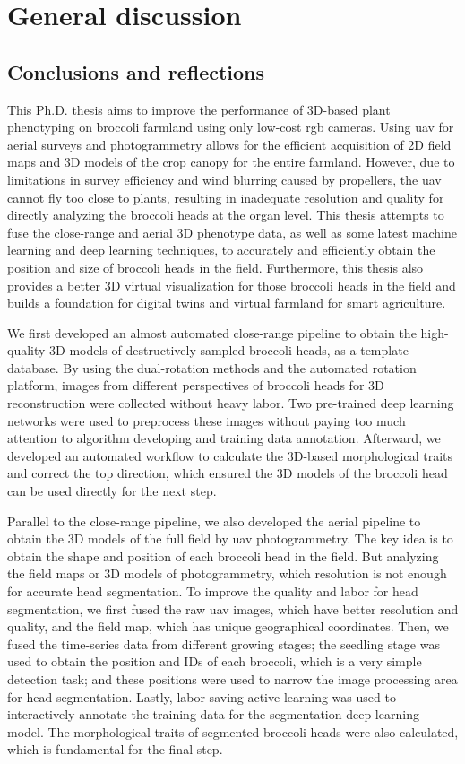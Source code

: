 \chapter{General discussion}

\section{Conclusions and reflections}

This Ph.D. thesis aims to improve the performance of 3D-based plant phenotyping on broccoli farmland using only low-cost \gls{rgb} cameras. Using \gls{uav} for aerial surveys and photogrammetry allows for the efficient acquisition of 2D field maps and 3D models of the crop canopy for the entire farmland. However, due to limitations in survey efficiency and wind blurring caused by propellers, the \gls{uav} cannot fly too close to plants, resulting in inadequate resolution and quality for directly analyzing the broccoli heads at the organ level. This thesis attempts to fuse the close-range and aerial 3D phenotype data, as well as some latest machine learning and deep learning techniques, to accurately and efficiently obtain the position and size of broccoli heads in the field. Furthermore, this thesis also provides a better 3D virtual visualization for those broccoli heads in the field and builds a foundation for digital twins and virtual farmland for smart agriculture. 

We first developed an almost automated close-range pipeline to obtain the high-quality 3D models of destructively sampled broccoli heads, as a template database. By using the dual-rotation methods and the automated rotation platform, images from different perspectives of broccoli heads for 3D reconstruction were collected without heavy labor. Two pre-trained deep learning networks were used to preprocess these images without paying too much attention to algorithm developing and training data annotation. Afterward, we developed an automated workflow to calculate the 3D-based morphological traits and correct the top direction, which ensured the 3D models of the broccoli head can be used directly for the next step.

Parallel to the close-range pipeline, we also developed the aerial pipeline to obtain the 3D models of the full field by \gls{uav} photogrammetry. The key idea is to obtain the shape and position of each broccoli head in the field. But analyzing the field maps or 3D models of photogrammetry, which resolution is not enough for accurate head segmentation. To improve the quality and labor for head segmentation, we first fused the raw \gls{uav} images, which have better resolution and quality, and the field map, which has unique geographical coordinates. Then, we fused the time-series data from different growing stages; the seedling stage was used to obtain the position and IDs of each broccoli, which is a very simple detection task; and these positions were used to narrow the image processing area for head segmentation. Lastly, labor-saving active learning was used to interactively annotate the training data for the segmentation deep learning model. The morphological traits of segmented broccoli heads were also calculated, which is fundamental for the final step.

